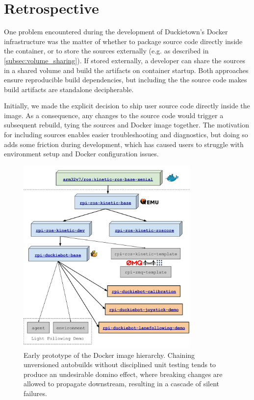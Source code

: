 \documentclass[12pt,initial,twoside,maitrise]{dms}
\numberwithin{equation}{section}
\numberwithin{table}{chapter}
\numberwithin{figure}{chapter}
\begin{document}
\section{Retrospective}\label{sec:retrospective}

One problem encountered during the development of Duckietown's Docker infrastructure was the matter of whether to package source code directly inside the container, or to store the sources externally (e.g. as described in \autoref{subsec:volume_sharing}). If stored externally, a developer can share the sources in a shared volume and build the artifacts on container startup. Both approaches ensure reproducible build dependencies, but including the the source code makes build artifacts are standalone decipherable.

Initially, we made the explicit decision to ship user source code directly inside the image. As a consequence, any changes to the source code would trigger a subsequent rebuild, tying the sources and Docker image together. The motivation for including sources enables easier troubleshooting and diagnostics, but doing so adds some friction during development, which has caused users to struggle with environment setup and Docker configuration issues.

\begin{figure}
\includegraphics[width=0.80\textwidth]{image_provenance.png}
\caption{Early prototype of the Docker image hierarchy. Chaining unversioned autobuilds without disciplined unit testing tends to produce an undesirable domino effect, where breaking changes are allowed to propagate downstream, resulting in a cascade of silent failures.}
    \label{fig:early_prototype}
\end{figure}
\end{document}

